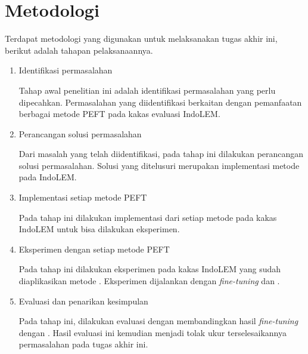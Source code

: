\section{Metodologi}

Terdapat metodologi yang digunakan untuk melaksanakan tugas akhir ini, berikut adalah tahapan pelaksanaannya.

\begin{enumerate}
    \item Identifikasi permasalahan

    Tahap awal penelitian ini adalah identifikasi permasalahan yang perlu dipecahkan. Permasalahan yang diidentifikasi berkaitan dengan pemanfaatan berbagai metode PEFT pada kakas evaluasi IndoLEM.

    \item Perancangan solusi permasalahan

    Dari masalah yang telah diidentifikasi, pada tahap ini dilakukan perancangan solusi permasalahan. Solusi yang ditelusuri merupakan implementasi metode \PEFT pada IndoLEM.

    \item Implementasi setiap metode PEFT

    Pada tahap ini dilakukan implementasi dari setiap metode \PEFT pada kakas IndoLEM untuk bisa dilakukan eksperimen.

    \item Eksperimen dengan setiap metode PEFT

    Pada tahap ini dilakukan eksperimen pada kakas IndoLEM yang sudah diaplikasikan metode \PEFT. Eksperimen  dijalankan dengan \textit{fine-tuning}  dan \PEFT.

    \item Evaluasi dan penarikan kesimpulan

    Pada tahap ini, dilakukan evaluasi dengan membandingkan hasil \textit{fine-tuning}  dengan \PEFT. Hasil evaluasi ini kemudian  menjadi tolak ukur terselesaikannya permasalahan pada tugas akhir ini.

\end{enumerate}
